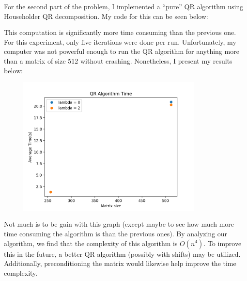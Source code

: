 \documentclass{article}
\begin{document}
For the second part of the problem, I implemented a ``pure'' QR algorithm using Householder QR decomposition.
My code for this can be seen below:




This computation is significantly more time consuming than the previous one. 
For this experiment, only five iterations were done per run. 
Unfortunately, my computer was not powerful enough to run the QR algorithm for anything more than a matrix of size 512 without crashing.
Nonetheless, I present my results below:

\begin{figure}[H]
\centering
\includegraphics[height=7cm]{QR}	
\end{figure}

Not much is to be gain with this graph (except maybe to see how much more time consuming the algorithm is than the previous ones). 
By analyzing our algorithm, we find that the complexity of this algorithm is $O(n^4)$. 
To improve this in the future, a better QR algorithm (possibly with shifts) may be utilized. 
Additionally, preconditioning the matrix would likewise help improve the time complexity. 
\end{document}
